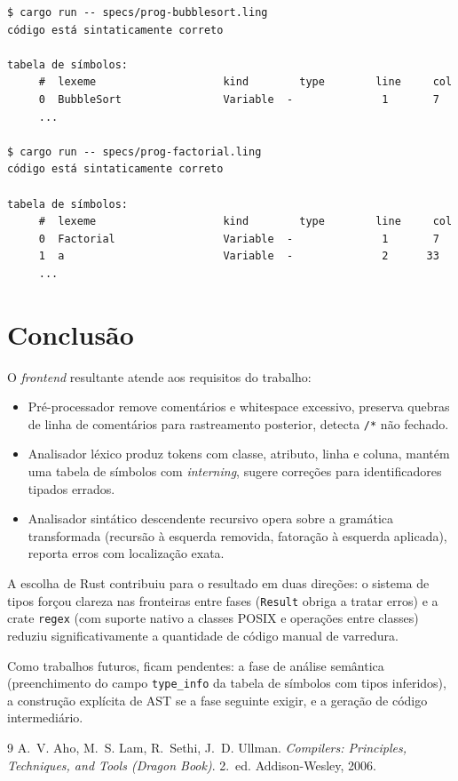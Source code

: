 \documentclass[12pt,a4paper]{article}
\begin{document}
\begin{verbatim}
$ cargo run -- specs/prog-bubblesort.ling
código está sintaticamente correto

tabela de símbolos:
     #  lexeme                    kind        type        line     col
     0  BubbleSort                Variable  -              1       7
     ...

$ cargo run -- specs/prog-factorial.ling
código está sintaticamente correto

tabela de símbolos:
     #  lexeme                    kind        type        line     col
     0  Factorial                 Variable  -              1       7
     1  a                         Variable  -              2      33
     ...
\end{verbatim}

\section{Conclusão}

O \emph{frontend} resultante atende aos requisitos do trabalho:

\begin{itemize}
  \item Pré-processador remove comentários e whitespace excessivo,
    preserva quebras de linha de comentários para rastreamento
    posterior, detecta \verb|/*| não fechado.
  \item Analisador léxico produz tokens com classe, atributo, linha e
    coluna, mantém uma tabela de símbolos com \emph{interning},
    sugere correções para identificadores tipados errados.
  \item Analisador sintático descendente recursivo opera sobre a
    gramática transformada (recursão à esquerda removida, fatoração à
    esquerda aplicada), reporta erros com localização exata.
\end{itemize}

A escolha de Rust contribuiu para o resultado em duas direções: o
sistema de tipos forçou clareza nas fronteiras entre fases
(\texttt{Result} obriga a tratar erros) e a crate \texttt{regex} (com
suporte nativo a classes POSIX e operações entre classes) reduziu
significativamente a quantidade de código manual de varredura.

Como trabalhos futuros, ficam pendentes: a fase de análise semântica
(preenchimento do campo \texttt{type\_info} da tabela de símbolos com
tipos inferidos), a construção explícita de AST se a fase seguinte
exigir, e a geração de código intermediário.

\begin{thebibliography}{9}
A.~V. Aho, M.~S. Lam, R.~Sethi, J.~D. Ullman.
\emph{Compilers: Principles, Techniques, and Tools (Dragon Book)}.
2.~ed. Addison-Wesley, 2006.
\end{thebibliography}
\end{document}
